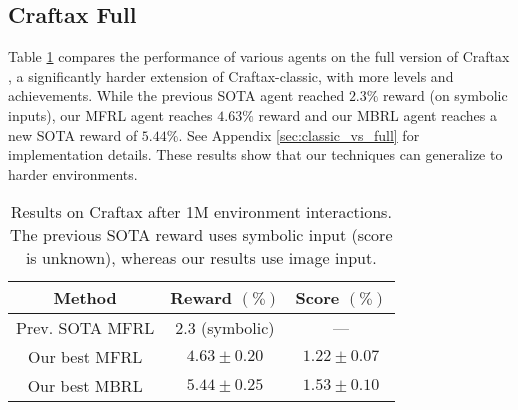 \subsection{Craftax Full}
\label{sec:craftax_full}

Table \ref{tab:craftax_full} compares the performance of various agents on
the full version of Craftax \citep{matthews2024craftax}, a significantly harder extension of Craftax-classic,
with more levels and achievements. While the previous SOTA agent reached $2.3\%$ reward (on symbolic inputs), our MFRL agent reaches
$4.63\%$ reward and our MBRL agent reaches a new SOTA reward of $5.44\%$.
See Appendix \ref{sec:classic_vs_full} for implementation details.
These results show that our techniques can generalize to harder environments.


\begin{table}[h!]
\caption{
Results on Craftax after 1M environment interactions.
The previous SOTA reward uses symbolic input (score is unknown),
whereas our results use image input.
}
\label{tab:craftax_full}
\small
\vspace{-.5em}
\centering
\begin{tabular}{ccc}
\toprule
Method & Reward $(\%)$ & Score $(\%)$ \\
\midrule
Prev. SOTA MFRL  & $2.3$ (symbolic) & --- \\
Our best MFRL &  $4.63 \pm 0.20$ & $1.22 \pm 0.07$ \\
Our best MBRL  & $5.44 \pm 0.25$ & $1.53 \pm 0.10$ \\
\bottomrule
\end{tabular}
\vspace{-.25em}
\end{table}





 
